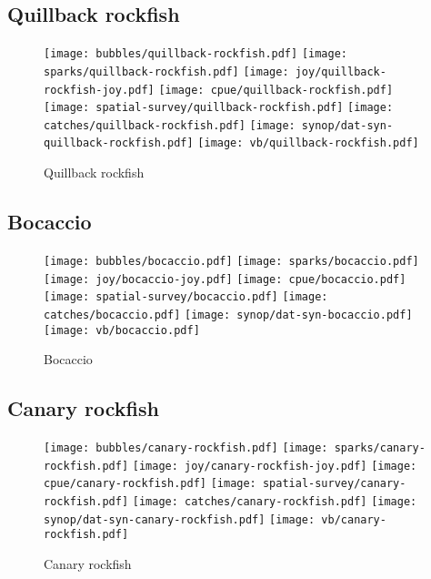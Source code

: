 \subsection*{Quillback rockfish}

\begin{figure}[htbp]
\centering
\texttt{[image: bubbles/quillback-rockfish.pdf]}
\texttt{[image: sparks/quillback-rockfish.pdf]}
\texttt{[image: joy/quillback-rockfish-joy.pdf]}
\texttt{[image: cpue/quillback-rockfish.pdf]}
\texttt{[image: spatial-survey/quillback-rockfish.pdf]}
\texttt{[image: catches/quillback-rockfish.pdf]}
\texttt{[image: synop/dat-syn-quillback-rockfish.pdf]}
\texttt{[image: vb/quillback-rockfish.pdf]}
\caption{Quillback rockfish}
\end{figure}
\clearpage
\subsection*{Bocaccio}

\begin{figure}[htbp]
\centering
\texttt{[image: bubbles/bocaccio.pdf]}
\texttt{[image: sparks/bocaccio.pdf]}
\texttt{[image: joy/bocaccio-joy.pdf]}
\texttt{[image: cpue/bocaccio.pdf]}
\texttt{[image: spatial-survey/bocaccio.pdf]}
\texttt{[image: catches/bocaccio.pdf]}
\texttt{[image: synop/dat-syn-bocaccio.pdf]}
\texttt{[image: vb/bocaccio.pdf]}
\caption{Bocaccio}
\end{figure}
\clearpage
\subsection*{Canary rockfish}

\begin{figure}[htbp]
\centering
\texttt{[image: bubbles/canary-rockfish.pdf]}
\texttt{[image: sparks/canary-rockfish.pdf]}
\texttt{[image: joy/canary-rockfish-joy.pdf]}
\texttt{[image: cpue/canary-rockfish.pdf]}
\texttt{[image: spatial-survey/canary-rockfish.pdf]}
\texttt{[image: catches/canary-rockfish.pdf]}
\texttt{[image: synop/dat-syn-canary-rockfish.pdf]}
\texttt{[image: vb/canary-rockfish.pdf]}
\caption{Canary rockfish}
\end{figure}
\clearpage
